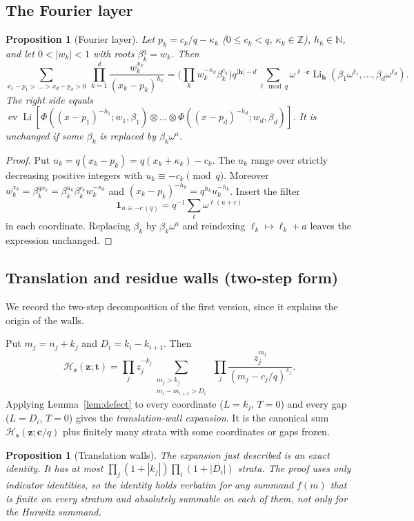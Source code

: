 \documentclass[11pt]{amsart}
\newtheorem{proposition}[theorem]{Proposition}
\theoremstyle{definition}
\theoremstyle{remark}
\numberwithin{equation}{section}
\newcommand{\N}{\mathbb{N}}
\newcommand{\Z}{\mathbb{Z}}
\newcommand{\Li}{\operatorname{Li}}
\newcommand{\ev}{\operatorname{ev}}
\newcommand{\one}{\mathbf{1}}
\newcommand{\s}{\mathbf{s}}
\newcommand{\z}{\mathbf{z}}
\newcommand{\tb}{\mathbf{t}}
\newcommand{\cb}{\mathbf{c}}
\newcommand{\hb}{\mathbf{h}}
\newcommand{\lb}{\boldsymbol{\ell}}
\newcommand{\Hs}{\mathcal{H}}
\begin{document}
\subsection{The Fourier layer}

\begin{proposition}[Fourier layer]\label{prop:fourier}
Let $p_k=c_k/q-\kappa_k$ ($0\le c_k<q$, $\kappa_k\in\Z$), $h_k\in\N$, and let $0<|w_k|<1$ with roots $\beta_k^q=w_k$. Then
\[
\sum_{x_1-p_1>\dots>x_d-p_d>0}\ \prod_{k=1}^d\frac{w_k^{x_k}}{(x_k-p_k)^{h_k}}
=\Big(\prod_k w_k^{-\kappa_k}\beta_k^{c_k}\Big)q^{|\hb|-d}\sum_{\lb\bmod q}\omega^{\lb\cdot\cb}\Li_\hb(\beta_1\omega^{\ell_1},\dots,\beta_d\omega^{\ell_d}).
\]
The right side equals $\ev\Li[\Phi((x-p_1)^{-h_1};w_1,\beta_1)\otimes\dots\otimes\Phi((x-p_d)^{-h_d};w_d,\beta_d)]$. It is unchanged if some $\beta_k$ is replaced by $\beta_k\omega^{a}$.
\end{proposition}

\begin{proof}
Put $u_k=q(x_k-p_k)=q(x_k+\kappa_k)-c_k$. The $u_k$ range over strictly decreasing positive integers with $u_k\equiv-c_k\pmod q$. Moreover $w_k^{x_k}=\beta_k^{qx_k}=\beta_k^{u_k}\beta_k^{c_k}w_k^{-\kappa_k}$ and $(x_k-p_k)^{-h_k}=q^{h_k}u_k^{-h_k}$. Insert the filter
\[
\one_{u\equiv-c\,(q)}=q^{-1}\sum_{\ell}\omega^{\ell(u+c)}
\]
in each coordinate. Replacing $\beta_k$ by $\beta_k\omega^a$ and reindexing $\ell_k\mapsto\ell_k+a$ leaves the expression unchanged.
\end{proof}

\subsection{Translation and residue walls (two-step form)}\label{sec:twostep}
We record the two-step decomposition of the first version, since it explains the origin of the walls.

Put $m_j=n_j+k_j$ and $D_i=k_i-k_{i+1}$. Then
\[
\Hs_\s(\z;\tb)=\prod_jz_j^{-k_j}\sum_{\substack{m_j>k_j\\ m_i-m_{i+1}>D_i}}\ \prod_j\frac{z_j^{m_j}}{(m_j-c_j/q)^{s_j}} .
\]
Applying Lemma~\ref{lem:defect} to every coordinate ($L=k_j$, $T=0$) and every gap ($L=D_i$, $T=0$) gives the \emph{translation-wall expansion}. It is the canonical sum $\Hs_\s(\z;\cb/q)$ plus finitely many strata with some coordinates or gaps frozen.

\begin{proposition}[Translation walls]\label{prop:translation}
The expansion just described is an exact identity. It has at most $\prod_j(1+|k_j|)\prod_i(1+|D_i|)$ strata. The proof uses only indicator identities, so the identity holds verbatim for any summand $f(m)$ that is finite on every stratum and absolutely summable on each of them, not only for the Hurwitz summand.
\end{proposition}
\end{document}
